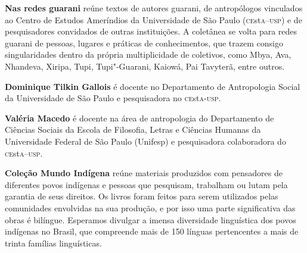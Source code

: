 \textbf{Nas redes guarani} reúne textos de autores guarani, de antropólogos vinculados ao Centro de Estudos Ameríndios da Universidade de São Paulo (\textsc{ce}st\textsc{a}--\textsc{usp}) e de pesquisadores convidados de outras instituições. A coletânea se volta para redes guarani de pessoas, lugares e práticas de conhecimentos, que trazem consigo singularidades dentro da própria multiplicidade de coletivos, como Mbya, Ava, Nhandeva, Xiripa, Tupi, Tupi"-Guarani, Kaiowá, Pai Tavyterã, entre outros. 

\textbf{Dominique Tilkin Gallois} é docente no Departamento de Antropologia Social da Universidade de São Paulo e pesquisadora no \textsc{ce}st\textsc{a}-\textsc{usp}.

\textbf{Valéria Macedo} é docente na área de antropologia do Departamento de Ciências Sociais da Escola de Filosofia, Letras e Ciências Humanas da Universidade Federal de São Paulo (Unifesp) e pesquisadora colaboradora do \textsc{ce}st\textsc{a}--\textsc{usp}.

\textbf{Coleção Mundo Indígena} reúne materiais produzidos com pensadores de diferentes povos indígenas e pessoas que pesquisam, trabalham ou lutam pela garantia de seus direitos. Os livros foram feitos para serem utilizados pelas comunidades envolvidas na sua produção, e por isso uma parte significativa das obras é bilíngue. Esperamos divulgar a imensa diversidade linguística dos povos indígenas no Brasil, que compreende mais de 150 línguas pertencentes a mais de trinta famílias linguísticas.




